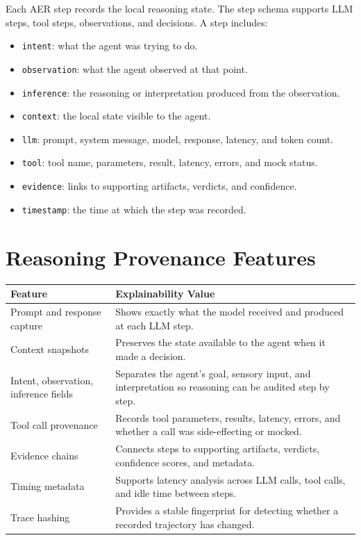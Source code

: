 \documentclass[11pt,a4paper]{article}
\begin{document}
Each AER step records the local reasoning state. The step schema supports LLM
steps, tool steps, observations, and decisions. A step includes:

\begin{itemize}[leftmargin=1.5em]
  \item \texttt{intent}: what the agent was trying to do.
  \item \texttt{observation}: what the agent observed at that point.
  \item \texttt{inference}: the reasoning or interpretation produced from the observation.
  \item \texttt{context}: the local state visible to the agent.
  \item \texttt{llm}: prompt, system message, model, response, latency, and token count.
  \item \texttt{tool}: tool name, parameters, result, latency, errors, and mock status.
  \item \texttt{evidence}: links to supporting artifacts, verdicts, and confidence.
  \item \texttt{timestamp}: the time at which the step was recorded.
\end{itemize}

\section{Reasoning Provenance Features}

\begin{table}[h]
\centering
\begin{tabularx}{\textwidth}{@{}p{}Y@{}}
\toprule
\textbf{Feature} & \textbf{Explainability Value} \\
\midrule
Prompt and response capture &
Shows exactly what the model received and produced at each LLM step. \\
Context snapshots &
Preserves the state available to the agent when it made a decision. \\
Intent, observation, inference fields &
Separates the agent's goal, sensory input, and interpretation so reasoning can
be audited step by step. \\
Tool call provenance &
Records tool parameters, results, latency, errors, and whether a call was
side-effecting or mocked. \\
Evidence chains &
Connects steps to supporting artifacts, verdicts, confidence scores, and
metadata. \\
Timing metadata &
Supports latency analysis across LLM calls, tool calls, and idle time between
steps. \\
Trace hashing &
Provides a stable fingerprint for detecting whether a recorded trajectory has
changed. \\
\bottomrule
\end{tabularx}
\end{table}
\end{document}

